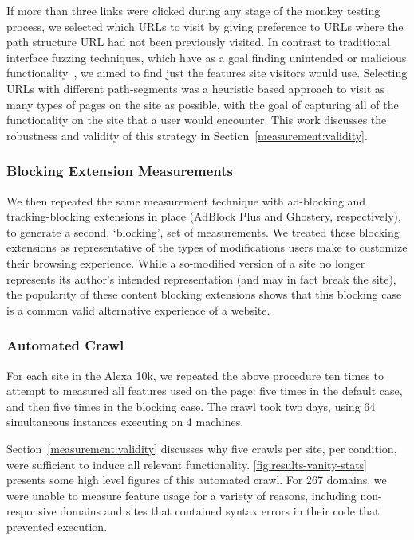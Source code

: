 If more than three links were clicked during any stage of the monkey testing
process, we selected which URLs to visit by giving preference to URLs where the
path structure URL had not been previously visited. In contrast to traditional
interface fuzzing techniques, which have as a goal finding unintended or
malicious functionality~\cite{amalfitano2012using,liu2014decaf}, we aimed to
find just the features site visitors would use. Selecting URLs with different
path-segments was a heuristic based approach to visit as many types of pages on
the site as possible, with the goal of capturing all of the functionality on
the site that a user would encounter.  This work discusses the robustness and
validity of this strategy in Section~\ref{measurement:validity}.


\subsubsection{Blocking Extension Measurements}
\label{measurement:methodology:blocking-case-measurements} We then repeated the
same measurement technique with ad-blocking and tracking-blocking extensions in
place (AdBlock Plus and Ghostery, respectively), to generate a second,
`blocking', set of measurements. We treated these blocking extensions as
representative of the types of modifications users make to customize their
browsing experience. While a so-modified version of a site no longer represents
its author's intended representation (and may in fact break the site), the
popularity of these content blocking extensions shows that this blocking case
is a common valid alternative experience of a website.


\subsubsection{Automated Crawl}
\label{measurement:methodology:automated-crawl}



For each site in the Alexa 10k, we repeated the above procedure ten times to
attempt to measured all features used on the page: five times in the default
case, and then five times in the blocking case.  The crawl took two days, using
64 simultaneous \FF instances executing on 4 machines.

Section~\ref{measurement:validity} discusses why five crawls per site, per
condition, were sufficient to induce all relevant functionality.
\ref{fig:results-vanity-stats} presents some high level figures of this
automated crawl.  For 267 domains, we were unable to measure feature usage for
a variety of reasons, including non-responsive domains and sites that contained
syntax errors in their \JS code that prevented execution.
